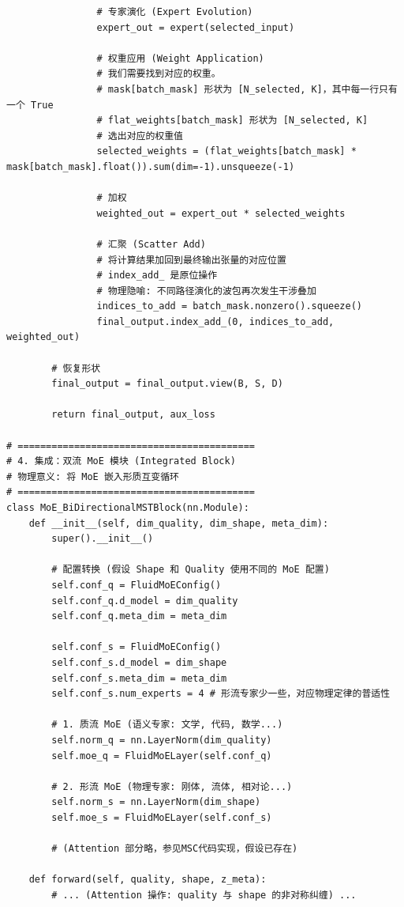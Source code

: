 \begin{lstlisting}
                # 专家演化 (Expert Evolution)
                expert_out = expert(selected_input)

                # 权重应用 (Weight Application)
                # 我们需要找到对应的权重。
                # mask[batch_mask] 形状为 [N_selected, K]，其中每一行只有一个 True
                # flat_weights[batch_mask] 形状为 [N_selected, K]
                # 选出对应的权重值
                selected_weights = (flat_weights[batch_mask] * mask[batch_mask].float()).sum(dim=-1).unsqueeze(-1)

                # 加权
                weighted_out = expert_out * selected_weights

                # 汇聚 (Scatter Add)
                # 将计算结果加回到最终输出张量的对应位置
                # index_add_ 是原位操作
                # 物理隐喻: 不同路径演化的波包再次发生干涉叠加
                indices_to_add = batch_mask.nonzero().squeeze()
                final_output.index_add_(0, indices_to_add, weighted_out)

        # 恢复形状
        final_output = final_output.view(B, S, D)

        return final_output, aux_loss

# ==========================================
# 4. 集成：双流 MoE 模块 (Integrated Block)
# 物理意义: 将 MoE 嵌入形质互变循环
# ==========================================
class MoE_BiDirectionalMSTBlock(nn.Module):
    def __init__(self, dim_quality, dim_shape, meta_dim):
        super().__init__()

        # 配置转换 (假设 Shape 和 Quality 使用不同的 MoE 配置)
        self.conf_q = FluidMoEConfig()
        self.conf_q.d_model = dim_quality
        self.conf_q.meta_dim = meta_dim

        self.conf_s = FluidMoEConfig()
        self.conf_s.d_model = dim_shape
        self.conf_s.meta_dim = meta_dim
        self.conf_s.num_experts = 4 # 形流专家少一些，对应物理定律的普适性

        # 1. 质流 MoE (语义专家: 文学, 代码, 数学...)
        self.norm_q = nn.LayerNorm(dim_quality)
        self.moe_q = FluidMoELayer(self.conf_q)

        # 2. 形流 MoE (物理专家: 刚体, 流体, 相对论...)
        self.norm_s = nn.LayerNorm(dim_shape)
        self.moe_s = FluidMoELayer(self.conf_s)

        # (Attention 部分略，参见MSC代码实现，假设已存在)

    def forward(self, quality, shape, z_meta):
        # ... (Attention 操作: quality 与 shape 的非对称纠缠) ...


\end{lstlisting}
